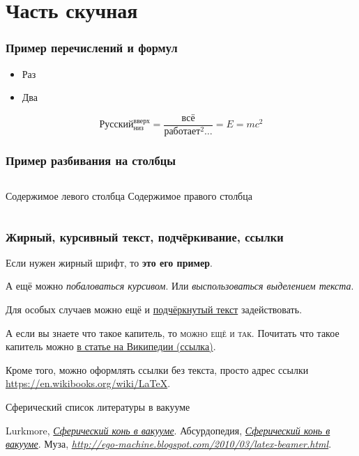 \documentclass[ignorenonframetext,hyperref={pdftex,unicode}]{beamer}
\begin{document}
\section{Часть скучная}
\begin{frame}\frametitle{Пример перечислений и формул} 
	\begin{itemize}
		\item Раз
		\item Два
	\end{itemize}
	\begin{equation}
    	Русский_{низ}^{вверх} = \frac{всё}{работает^2\dots} = E = m c^2
	\end{equation}
\end{frame}

\begin{frame}\frametitle{Пример разбивания на столбцы}
 	\begin{columns}
 			Содержимое левого столбца
 			Содержимое правого столбца
 	\end{columns}
\end{frame}

\begin{frame}\frametitle{Жирный, курсивный текст, подчёркивание, ссылки}
	Если нужен жирный шрифт, то \textbf{это его пример}.

	А ещё можно \textit{побаловаться курсивом}. Или \emph{выспользоваться выделением текста}.

	Для особых случаев можно ещё и \underline{подчёркнутый текст} задействовать.

	А если вы знаете что такое капитель, то \textsc{можно ещё и так}. Почитать что такое капитель можно \href{https://ru.wikipedia.org/wiki/\%D0\%9A\%D0\%B0\%D0\%BF\%D0\%B8\%D1\%82\%D0\%B5\%D0\%BB\%D1\%8C_\%28\%D1\%88\%D1\%80\%D0\%B8\%D1\%84\%D1\%82\%29}{в статье на Википедии (ссылка)}.

	Кроме того, можно оформлять ссылки без текста, просто адрес ссылки \url{https://en.wikibooks.org/wiki/LaTeX}.
\end{frame}


\begin{frame}{Сферический список литературы в вакууме}
	\begin{thebibliography}{10}
	\beamertemplatebookbibitems
		{\sc Lurkmore}, {\em \href{http://lurkmore.to/\%D0\%A1\%D1\%84\%D0\%B5\%D1\%80\%D0\%B8\%D1\%87\%D0\%B5\%D1\%81\%D0\%BA\%D0\%B8\%D0\%B9_\%D0\%BA\%D0\%BE\%D0\%BD\%D1\%8C_\%D0\%B2_\%D0\%B2\%D0\%B0\%D0\%BA\%D1\%83\%D1\%83\%D0\%BC\%D0\%B5}{Сферический конь в вакууме}}.
		{\sc Абсурдопедия}, {\em \href{http://absurdopedia.wikia.com/wiki/\%D0\%A1\%D1\%84\%D0\%B5\%D1\%80\%D0\%B8\%D1\%87\%D0\%B5\%D1\%81\%D0\%BA\%D0\%B8\%D0\%B9_\%D0\%BA\%D0\%BE\%D0\%BD\%D1\%8C_\%D0\%B2_\%D0\%B2\%D0\%B0\%D0\%BA\%D1\%83\%D1\%83\%D0\%BC\%D0\%B5}{Сферический конь в вакууме}}.
		{\sc Муза}, {\em \url{http://ego-machine.blogspot.com/2010/03/latex-beamer.html}}.
	\end{thebibliography}
\end{frame}
\end{document}

